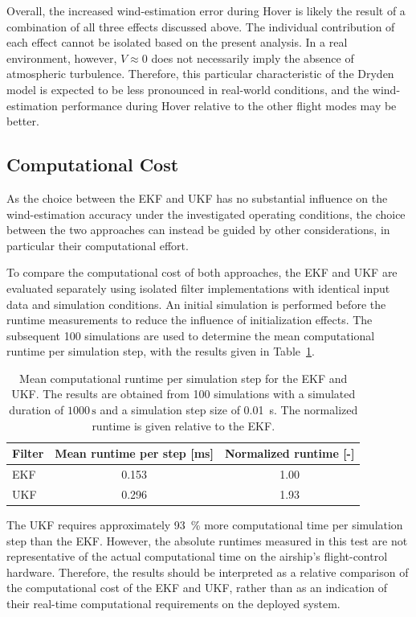 Overall, the increased wind-estimation error during Hover is likely the result of a combination of all three effects discussed above. The individual contribution of each effect cannot be isolated based on the present analysis. In a real environment, however, $V \approx 0$ does not necessarily imply the absence of atmospheric turbulence. Therefore, this particular characteristic of the Dryden model is expected to be less pronounced in real-world conditions, and the wind-estimation performance during Hover relative to the other flight modes may be better.





\subsection{Computational Cost}

As the choice between the EKF and UKF has no substantial influence on the wind-estimation accuracy under the investigated operating conditions, the choice between the two approaches can instead be guided by other considerations, in particular their computational effort.

To compare the computational cost of both approaches, the EKF and UKF are evaluated separately using isolated filter implementations with identical input data and simulation conditions. An initial simulation is performed before the runtime measurements to reduce the influence of initialization effects. The subsequent 100 simulations are used to determine the mean computational runtime per simulation step, with the results given in Table~\ref{tab:EKFvsUKF_Runtime}.

\begin{table}[htb]
	\centering
	\caption{Mean computational runtime per simulation step for the EKF and UKF. The results are obtained from 100 simulations with a simulated duration of $1000\,\mathrm{s}$ and a simulation step size of \SI{0.01}{s}. The normalized runtime is given relative to the EKF.}
	\label{tab:EKFvsUKF_Runtime}
	\begin{tabular}{lcc}
		\toprule
		Filter & Mean runtime per step [ms] & Normalized runtime [-] \\
		\midrule
		EKF & 0.153 & 1.00 \\
		UKF & 0.296 & 1.93 \\
		\bottomrule
	\end{tabular}
\end{table}

The UKF requires approximately \SI{93}{\percent} more computational time per simulation step than the EKF. However, the absolute runtimes measured in this test are not representative of the actual computational time on the airship's flight-control hardware. Therefore, the results should be interpreted as a relative comparison of the computational cost of the EKF and UKF, rather than as an indication of their real-time computational requirements on the deployed system.

